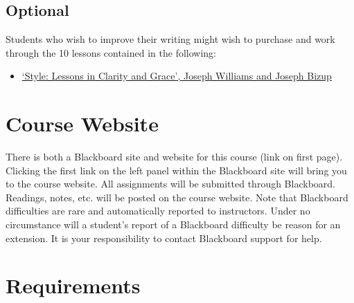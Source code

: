 \documentclass[article,oneside]{memoir}
\begin{document}
\subsection{Optional}
Students who wish to improve their writing might wish to purchase and work through the 10 lessons contained in the following: 
\begin{itemize}
\item \href{http://www.amazon.com/Style-Lessons-Clarity-Grace-11th/dp/0321898680/ref=sr_1_1?ie=UTF8&qid=1452356026&sr=8-1&keywords=lessons+in+clarity+and+grace}{`Style: Lessons in Clarity and Grace', Joseph Williams and Joseph Bizup}
\end{itemize}
\section{Course Website}
There is both a Blackboard site and website for this course (link on first page). Clicking the first link on the left panel within the Blackboard site will bring you to the course website. All assignments will be submitted through Blackboard. Readings, notes, etc. will be posted on the course website. Note that Blackboard difficulties are rare and automatically reported to instructors. Under no circumstance will a student's report of a Blackboard difficulty be reason for an extension. It is your responsibility to contact Blackboard support for help.


\section{Requirements}
\end{document}
